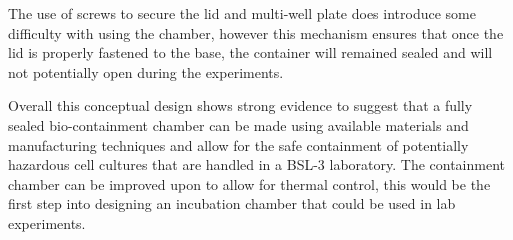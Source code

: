 \documentclass[class=report,11pt,crop=false]{standalone}
\begin{document}
The use of screws to secure the lid and multi-well plate does introduce some difficulty with using the chamber, however this mechanism ensures that once the lid is properly fastened to the base, the container will remained sealed and will not potentially open during the experiments.

Overall this conceptual design shows strong evidence to suggest that a fully sealed bio-containment chamber can be made using available materials and manufacturing techniques and allow for the safe containment of potentially hazardous cell cultures that are handled in a BSL-3 laboratory. The containment chamber can be improved upon to allow for thermal control, this would be the first step into designing an incubation chamber that could be used in lab experiments.
\ifstandalone

\fi
\end{document}
